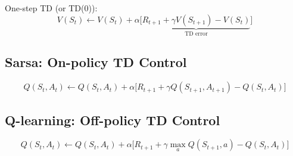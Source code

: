 One-step TD (or TD(0)):
$$V(S_t) \leftarrow V(S_t)+ \alpha \Big[\underbrace{R_{t+1}+\gamma V(S_{t+1})-V(S_t)}_{\text{TD error}}\Big] $$

\subsection{Sarsa: On-policy TD Control}
$$Q(S_t, A_t) \leftarrow Q(S_t, A_t)+ \alpha \Big[R_{t+1}+\gamma Q(S_{t+1}, A_{t+1})-Q(S_t, A_t)\Big] $$


\subsection{Q-learning: Off-policy TD Control}

$$Q(S_t, A_t) \leftarrow Q(S_t, A_t)+ \alpha \Big[R_{t+1}+\gamma \max_a Q(S_{t+1}, a)-Q(S_t, A_t)\Big] $$

